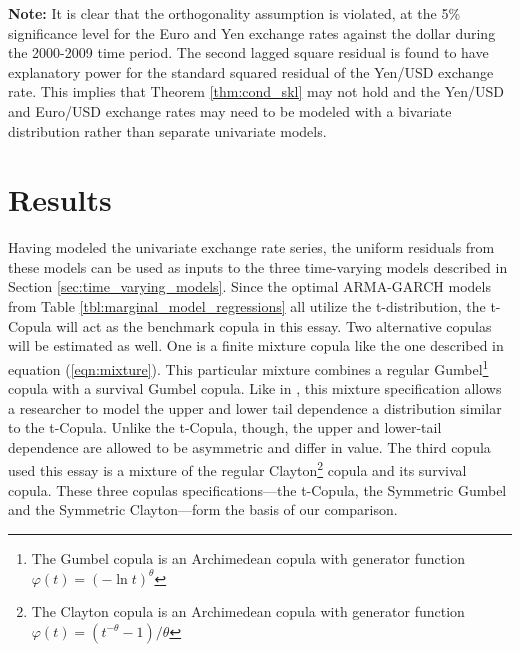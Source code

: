 \documentclass[12pt]{article}
\begin{document}
\begin{table}
\begin{tablenotes}
		\item{\footnotesize \textbf{Note:} It is clear that the orthogonality assumption is violated, at the 5\% significance level for the Euro and Yen exchange rates against the dollar during the 2000-2009 time period. The second lagged square residual is found to have explanatory power for the standard squared residual of the Yen/USD exchange rate. This implies that Theorem \ref{thm:cond_skl} may not hold and the Yen/USD and Euro/USD exchange rates may need to be modeled with a bivariate distribution rather than separate univariate models.}
	\end{tablenotes}
	\label{tbl:Conditioning_Variable_Checks}
\end{table}

\section{Results} \label{sec:Results}

Having modeled the univariate exchange rate series, the uniform residuals from these models can be used as inputs to the three time-varying models described in Section \ref{sec:time_varying_models}. Since the optimal ARMA-GARCH models from Table \ref{tbl:marginal_model_regressions} all utilize the t-distribution, the t-Copula will act as the benchmark copula in this essay. Two alternative copulas will be estimated as well. One is a finite mixture copula like the one described in equation (\ref{eqn:mixture}). This particular mixture combines a regular Gumbel\footnote{The Gumbel copula is an Archimedean copula with generator function $\varphi\left(t\right) = \left(-\ln t\right)^{\theta}$} copula with a survival Gumbel copula. Like in \cite{Patton_2006}, this mixture specification allows a researcher to model the upper and lower tail dependence a distribution similar to the t-Copula. Unlike the t-Copula, though, the upper and lower-tail dependence are allowed to be asymmetric and differ in value. The third copula used this essay is a mixture of the regular Clayton\footnote{The Clayton copula is an Archimedean copula with generator function $\varphi\left(t\right) = (t^{-\theta} - 1) / \theta$} copula and its survival copula. These three copulas specifications---the t-Copula, the Symmetric Gumbel and the Symmetric Clayton---form the basis of our comparison. 
\end{document}
